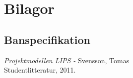 \documentclass[a4paper,12pt]{article}
\begin{document}


\newpage
\appendix
\section{Bilagor} \label{app:rules}


\subsection{Banspecifikation} \label{app:bana}

\newpage


\begin{thebibliography}{99}
\textit{Projektmodellen LIPS - } Svensson, Tomas
\\Studentlitteratur, 2011.
\end{thebibliography}
\end{document}
